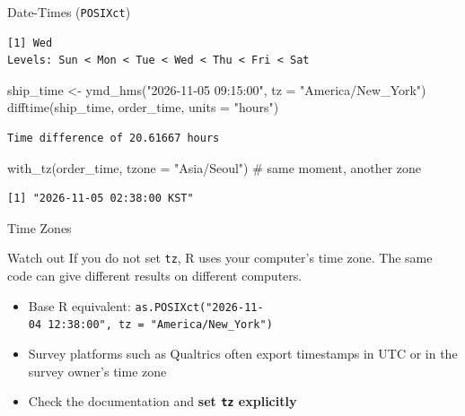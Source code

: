 \documentclass[
  ignorenonframetext,
  aspectratio=169,
]{beamer}
\newenvironment{Shaded}{\begin{snugshade}}{\end{snugshade}}
\newcommand{\AttributeTok}[1]{\textcolor[rgb]{0.40,0.45,0.13}{#1}}
\newcommand{\CommentTok}[1]{\textcolor[rgb]{0.37,0.37,0.37}{#1}}
\newcommand{\FunctionTok}[1]{\textcolor[rgb]{0.28,0.35,0.67}{#1}}
\newcommand{\NormalTok}[1]{\textcolor[rgb]{0.00,0.23,0.31}{#1}}
\newcommand{\OtherTok}[1]{\textcolor[rgb]{0.00,0.23,0.31}{#1}}
\newcommand{\StringTok}[1]{\textcolor[rgb]{0.13,0.47,0.30}{#1}}
\providecommand{\tightlist}{%
  \setlength{\itemsep}{0pt}\setlength{\parskip}{0pt}}\usepackage{longtable,booktabs,array}
\begin{document}
\begin{frame}[fragile]{Date-Times (\texttt{POSIXct})}
\begin{verbatim}
[1] Wed
Levels: Sun < Mon < Tue < Wed < Thu < Fri < Sat
\end{verbatim}

\begin{Shaded}
\begin{Highlighting}[]
\NormalTok{ship\_time }\OtherTok{\textless{}{-}} \FunctionTok{ymd\_hms}\NormalTok{(}\StringTok{"2026{-}11{-}05 09:15:00"}\NormalTok{, }\AttributeTok{tz =} \StringTok{"America/New\_York"}\NormalTok{)}
\FunctionTok{difftime}\NormalTok{(ship\_time, order\_time, }\AttributeTok{units =} \StringTok{"hours"}\NormalTok{)}
\end{Highlighting}
\end{Shaded}

\begin{verbatim}
Time difference of 20.61667 hours
\end{verbatim}

\begin{Shaded}
\begin{Highlighting}[]
\FunctionTok{with\_tz}\NormalTok{(order\_time, }\AttributeTok{tzone =} \StringTok{"Asia/Seoul"}\NormalTok{)        }\CommentTok{\# same moment, another zone}
\end{Highlighting}
\end{Shaded}

\begin{verbatim}
[1] "2026-11-05 02:38:00 KST"
\end{verbatim}
\end{frame}

\begin{frame}[fragile]{Time Zones}
\protect\hypertarget{time-zones}{}
\begin{alertblock}{Watch out}
\protect\hypertarget{watch-out}{}
If you do not set \texttt{tz}, R uses your computer's time zone. The
same code can give different results on different computers.

\begin{itemize}
\tightlist
\item
  Base R equivalent:
  \texttt{as.POSIXct("2026-11-04\ 12:38:00",\ tz\ =\ "America/New\_York")}
\item
  Survey platforms such as Qualtrics often export timestamps in UTC or
  in the survey owner's time zone
\item
  Check the documentation and \textbf{set \texttt{tz} explicitly}
\end{itemize}
\end{alertblock}
\end{frame}
\end{document}
